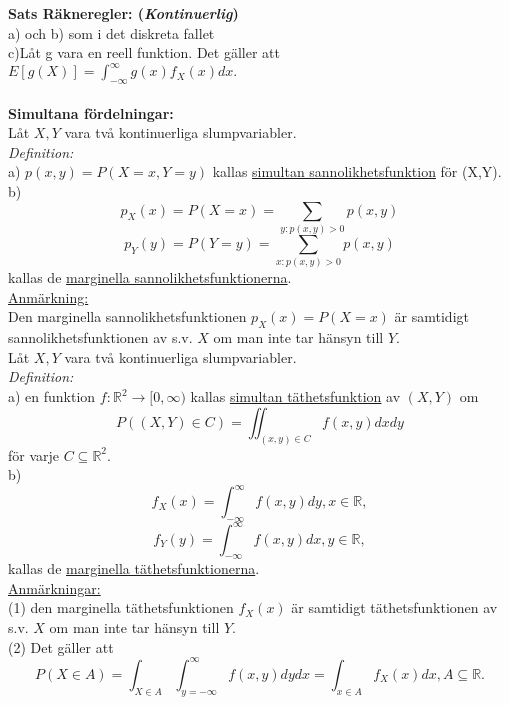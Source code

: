 \documentclass[8pt]{extarticle}
\begin{document}
\begin{multicols*}{2}
\textbf{Sats Räkneregler: (\textit{Kontinuerlig})}\\
a) och b) som i det diskreta fallet\\
c)Låt g vara en reell funktion. Det gäller att $E[g(X)]
= \int_{-\infty}^{\infty} g(x)f_X(x)dx.$\\
\\
\textbf{Simultana fördelningar:}\\
Låt $X,Y$ vara två kontinuerliga slumpvariabler.\\
\textit{Definition:}\\
a) $p(x, y) = P(X=x, Y=y)$ kallas \underline{simultan sannolikhetsfunktion} för (X,Y).\\
b)
\begin{equation*}
p_X(x) = P(X=x) = \sum_{y:p(x,y)>0}p(x,y)
\end{equation*}
\begin{equation*}
p_Y(y) = P(Y=y) = \sum_{x:p(x,y)>0}p(x,y)
\end{equation*}
kallas de \underline{marginella sannolikhetsfunktionerna}.\\
\underline{Anmärkning:}\\
Den marginella sannolikhetsfunktionen $p_X(x) = P(X=x)$ är samtidigt sannolikhetsfunktionen av s.v. $X$ om man inte tar hänsyn till $Y$.\\

Låt $X,Y$ vara två kontinuerliga slumpvariabler.\\
\textit{Definition:}\\
a) en funktion $f: \mathbb{R}^2 \longrightarrow [0,\infty)$ kallas \underline{simultan täthetsfunktion} av $(X,Y)$ om 
\begin{equation*}
P((X,Y) \in C) = \iint_{(x,y) \in C} f(x,y)dxdy
\end{equation*}
för varje $C \subseteq \mathbb{R}^2$.\\
b)
\begin{equation*}
f_X(x) = \int_{-\infty}^{\infty}f(x,y)dy, x\in\mathbb{R},
\end{equation*}
\begin{equation*}
f_Y(y) = \int_{-\infty}^{\infty}f(x,y)dx, y\in\mathbb{R},
\end{equation*}
kallas de \underline{marginella täthetsfunktionerna}.\\
\underline{Anmärkningar:}\\
(1) den marginella täthetsfunktionen $f_X(x)$ är samtidigt täthetsfunktionen av s.v. $X$ om man inte tar hänsyn till $Y$.\\
(2) Det gäller att 
\begin{equation*}
P(X \in A) = \int_{X \in A} \int_{y = -\infty}^{\infty} f(x,y) dydx = \int_{x \in A} f_X(x) dx, A \subseteq \mathbb{R}.
\end{equation*}


\end{multicols*}
\end{document}
